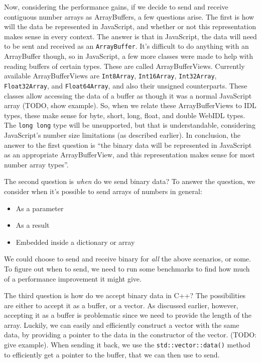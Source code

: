 Now, considering the performance gains, if we decide to send and receive contiguous number arrays as ArrayBuffers, a few questions arise. The first is how will the data be represented in JavaScript, and whether or not this representation makes sense in every context. The answer is that in JavaScript, the data will need to be sent and received as an \lstinline{ArrayBuffer}. It's difficult to do anything with an ArrayBuffer though, so in JavaScript, a few more classes were made to help with reading buffers of certain types. These are called ArrayBufferViews. Currently available ArrayBufferViews are \lstinline{Int8Array}, \lstinline{Int16Array}, \lstinline{Int32Array}, \lstinline{Float32Array}, and \lstinline{Float64Array}, and also their unsigned counterparts. These classes allow accessing the data of a buffer as though it was a normal JavaScript array (TODO, show example). So, when we relate these ArrayBufferViews to IDL types, these make sense for byte, short, long, float, and double WebIDL types. The \lstinline{long long} type will be unsupported, but that is understandable, considering JavaScript's number size limitations (as described earlier). In conclusion, the answer to the first question is ``the binary data will be represented in JavaScript as an appropriate ArrayBufferView, and this representation makes sense for most number array types''.

The second question is \emph{when} do we send binary data? To answer the question, we consider when it's possible to send arrays of numbers in general:

\begin{itemize}
	\item As a parameter
	\item As a result
	\item Embedded inside a dictionary or array
\end{itemize}

We could choose to send and receive binary for \emph{all} the above scenarios, or some. To figure out when to send, we need to run some benchmarks to find how much of a performance improvement it might give.

The third question is how do we accept binary data in C++? The possibilities are either to accept it as a buffer, or a vector. As discussed earlier, however, accepting it as a buffer is problematic since we need to provide the length of the array. Luckily, we can easily and efficiently construct a vector with the same data, by providing a pointer to the data in the constructor of the vector. (TODO: give example). When sending it back, we use the \lstinline{std::vector::data()} method to efficiently get a pointer to the buffer, that we can then use to send.

